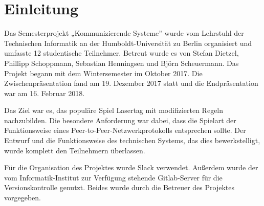 \section{Einleitung}

Das Semesterprojekt „Kommunizierende Systeme” wurde vom Lehrstuhl der Technischen Informatik an der
Humboldt-Universität zu Berlin organisiert und umfasste 12 studentische Teilnehmer.
Betreut wurde es von Stefan Dietzel, Phillipp Schoppmann, Sebastian Henningsen und Björn
Scheuermann.
Das Projekt begann mit dem Wintersemester im Oktober 2017.
Die Zwischenpräsentation fand am 19. Dezember 2017 statt und die Endpräsentation war am
16. Februar 2018.

Das Ziel war es, das populäre Spiel Lasertag mit modifizierten Regeln nachzubilden.
Die besondere Anforderung war dabei, dass die Spielart der Funktionsweise eines
Peer-to-Peer-Netzwerkprotokolls entsprechen sollte.
Der Entwurf und die Funktionsweise des technischen Systems, das dies bewerkstelligt, wurde komplett
den Teilnehmern überlassen.

Für die Organisation des Projektes wurde Slack verwendet.
Außerdem wurde der vom Informatik-Institut zur Verfügung stehende Gitlab-Server für die
Versionskontrolle genutzt.
Beides wurde durch die Betreuer des Projektes vorgegeben.
